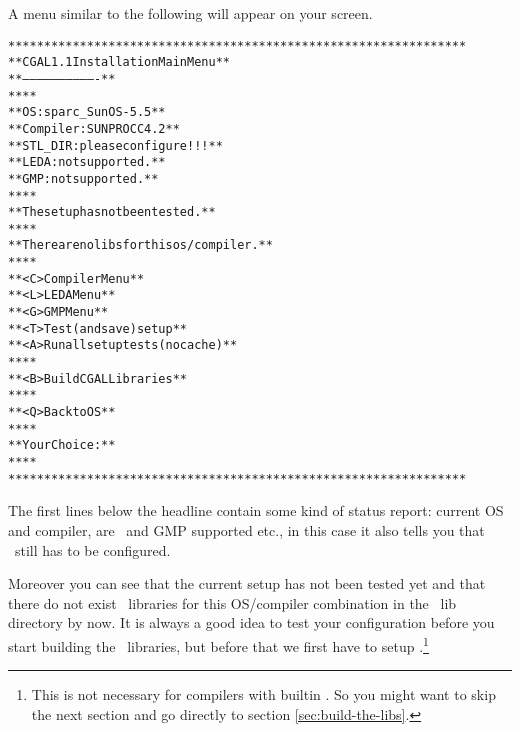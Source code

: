 A menu similar to the following will appear on your screen.

\begin{scriptsize}\label{pic:main-menu}
\begin{alltt}
  ****************************************************************
  **              CGAL 1.1 Installation Main Menu               **
  **              -------------------------------               **
  **                                                            **
  **   OS:                  sparc_SunOS-5.5                     **
  **   Compiler:            SUNPRO CC 4.2                       **
  **   STL_DIR:             please configure!!!                 **
  **   LEDA:                not supported.                      **
  **   GMP:                 not supported.                      **
  **                                                            **
  **   The setup has not been tested.                           **
  **                                                            **
  **   There are no libs for this os/compiler.                  **
  **                                                            **
  **   <C>  Compiler Menu                                       **
  **   <L>  LEDA Menu                                           **
  **   <G>  GMP Menu                                            **
  **   <T>  Test (and save) setup                               **
  **   <A>  Run all setup tests (no cache)                      **
  **                                                            **
  **   <B>  Build CGAL Libraries                                **
  **                                                            **
  **   <Q>  Back to OS                                          **
  **                                                            **
  **   Your Choice:                                             **
  **                                                            **
  ****************************************************************
\end{alltt}
\end{scriptsize}

The first lines below the headline contain some kind of status report:
current OS and compiler, are \leda\ and GMP supported etc., in this
case it also tells you that \stl\ still has to be configured.

Moreover you can see that the current setup has not been tested yet
and that there do not exist \cgal\ libraries for this OS/compiler
combination in the \cgal\ lib directory by now. It is always a good
idea to test your configuration before you start building the \cgal\ 
libraries, but before that we first have to setup \stl.\footnote{This
  is not necessary for compilers with builtin \stl. So you might want
  to skip the next section and go directly to section
  \ref{sec:build-the-libs}.}


